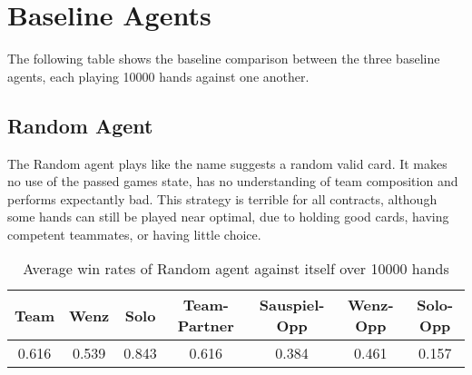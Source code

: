 \section{Baseline Agents}
The following table shows the baseline comparison between the three baseline agents, each playing 10000 hands against
one another.

\subsection{Random Agent}
The Random agent plays like the name suggests a random valid card.
It makes no use of the passed games state, has no understanding of team composition and performs expectantly bad.
This strategy is terrible for all contracts, although some hands can still be played near optimal, due to holding good
cards, having competent teammates, or having little choice.
\begin{table}[!h]
    \centering
    \begin{tabular}{ccccccc}
        \toprule
        Team  & Wenz  & Solo  & Team-Partner & Sauspiel-Opp & Wenz-Opp & Solo-Opp \\
        \midrule
        0.616 & 0.539 & 0.843 & 0.616        & 0.384        & 0.461    & 0.157    \\
        \bottomrule
    \end{tabular}
    \caption{Average win rates of Random agent against itself over 10000 hands}
    \label{tab:winratesRan}
\end{table}

